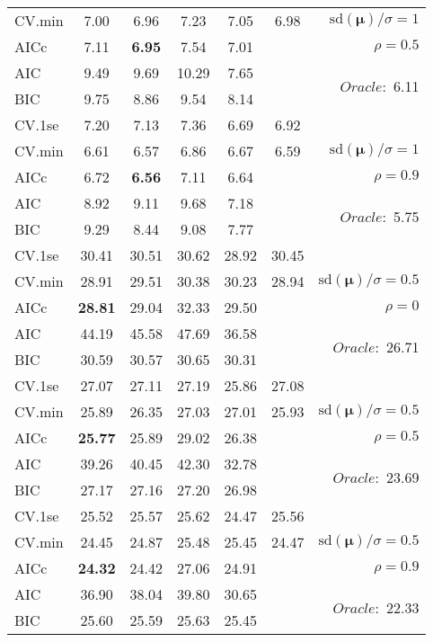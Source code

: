 \begin{table}
\begin{center}
\begin{tabular}{l*{5}{c}|r}
CV.min & 7.00 & 6.96 & 7.23 & 7.05 & 6.98 &  $\mathrm{sd}(\mathbf{\mu})/\sigma=1$ \\
AICc & 7.11 & {\bf 6.95} & 7.54 & 7.01 & & $\rho=0.5$ \\
AIC & 9.49 & 9.69 & 10.29 & 7.65 & &  \multirow{2}{*}{$Oracle: $ 6.11} \\
BIC & 9.75 & 8.86 & 9.54 & 8.14 & &  \\
 \hline 
CV.1se & 7.20 & 7.13 & 7.36 & 6.69 & 6.92 & \\
CV.min & 6.61 & 6.57 & 6.86 & 6.67 & 6.59 &  $\mathrm{sd}(\mathbf{\mu})/\sigma=1$ \\
AICc & 6.72 & {\bf 6.56} & 7.11 & 6.64 & & $\rho=0.9$ \\
AIC & 8.92 & 9.11 & 9.68 & 7.18 & &  \multirow{2}{*}{$Oracle: $ 5.75} \\
BIC & 9.29 & 8.44 & 9.08 & 7.77 & &  \\
 \hline 
CV.1se & 30.41 & 30.51 & 30.62 & 28.92 & 30.45 & \\
CV.min & 28.91 & 29.51 & 30.38 & 30.23 & 28.94 &  $\mathrm{sd}(\mathbf{\mu})/\sigma=0.5$ \\
AICc & {\bf 28.81} & 29.04 & 32.33 & 29.50 & & $\rho=0$ \\
AIC & 44.19 & 45.58 & 47.69 & 36.58 & &  \multirow{2}{*}{$Oracle: $ 26.71} \\
BIC & 30.59 & 30.57 & 30.65 & 30.31 & &  \\
 \hline 
CV.1se & 27.07 & 27.11 & 27.19 & 25.86 & 27.08 & \\
CV.min & 25.89 & 26.35 & 27.03 & 27.01 & 25.93 &  $\mathrm{sd}(\mathbf{\mu})/\sigma=0.5$ \\
AICc & {\bf 25.77} & 25.89 & 29.02 & 26.38 & & $\rho=0.5$ \\
AIC & 39.26 & 40.45 & 42.30 & 32.78 & &  \multirow{2}{*}{$Oracle: $ 23.69} \\
BIC & 27.17 & 27.16 & 27.20 & 26.98 & &  \\
 \hline 
CV.1se & 25.52 & 25.57 & 25.62 & 24.47 & 25.56 & \\
CV.min & 24.45 & 24.87 & 25.48 & 25.45 & 24.47 &  $\mathrm{sd}(\mathbf{\mu})/\sigma=0.5$ \\
AICc & {\bf 24.32} & 24.42 & 27.06 & 24.91 & & $\rho=0.9$ \\
AIC & 36.90 & 38.04 & 39.80 & 30.65 & &  \multirow{2}{*}{$Oracle: $ 22.33} \\
BIC & 25.60 & 25.59 & 25.63 & 25.45 & &  \\
 \hline 
\end{tabular}
\end{center}
\vspace{-1cm}
\end{table}




